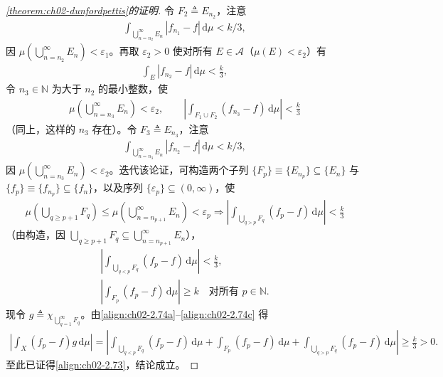 \documentclass[../../main.tex]{subfiles}%
\begin{document}
\begin{proof}[\cref{theorem:ch02-dunfordpettis}的证明]
令 $F_2\triangleq E_{n_2}$，注意
\begin{align*}
\int_{\bigcup_{n=n_2}^\infty E_n}|f_{n_1}-f|\,\mathrm{d}\mu<k/3,
\end{align*}
因 $\mu(\bigcup_{n=n_2}^\infty E_n)<\varepsilon_1$。再取 $\varepsilon_2>0$ 使对所有 $E\in\mathscr A$（$\mu(E)<\varepsilon_2$）有
\begin{align*}
\int_E|f_{n_2}-f|\,\mathrm{d}\mu<\frac k3,
\end{align*}
令 $n_3\in\mathbb N$ 为大于 $n_2$ 的最小整数，使
\begin{align*}
\mu\left(\bigcup_{n=n_3}^\infty E_n\right)<\varepsilon_2,\qquad
\left|\int_{F_1\cup F_2}(f_{n_3}-f)\,\mathrm{d}\mu\right|<\frac k3
\end{align*}
（同上，这样的 $n_3$ 存在）。令 $F_3\triangleq E_{n_3}$，注意
\begin{align*}
\int_{\bigcup_{n=n_3}^\infty E_n}|f_{n_2}-f|\,\mathrm{d}\mu<k/3,
\end{align*}
因 $\mu(\bigcup_{n=n_3}^\infty E_n)<\varepsilon_2$。迭代该论证，可构造两个子列 $\{F_p\}\equiv\{E_{n_p}\}\subseteq\{E_n\}$ 与 $\{f_p\}\equiv\{f_{n_p}\}\subseteq\{f_n\}$，以及序列 $\{\varepsilon_p\}\subseteq(0,\infty)$，使
\begin{align}
\mu\left(\bigcup_{q\geqslant p+1}F_q\right)\leqslant\mu\left(\bigcup_{n=n_{p+1}}^\infty E_n\right)<\varepsilon_p
\Rightarrow\left|\int_{\bigcup_{q>p}F_q}(f_p-f)\,\mathrm{d}\mu\right|<\frac k3 \label{align:ch02-2.74a}
\end{align}
（由构造，因 $\bigcup_{q\geqslant p+1}F_q\subseteq\bigcup_{n=n_{p+1}}^\infty E_n$），
\begin{align}
\left|\int_{\bigcup_{q<p}F_q}(f_p-f)\,\mathrm{d}\mu\right|<\frac k3, \label{align:ch02-2.74b}\\
\left|\int_{F_p}(f_p-f)\,\mathrm{d}\mu\right|\geqslant k\quad\text{对所有 }p\in\mathbb N. \label{align:ch02-2.74c}
\end{align}
现令 $g\triangleq \chi_{\bigcup_{q=1}^\infty F_q}$。由\eqref{align:ch02-2.74a}--\eqref{align:ch02-2.74c} 得
\begin{align*}
\left|\int_X(f_p-f)g\,\mathrm{d}\mu\right|
=\left|\int_{\bigcup_{q<p}F_q}(f_p-f)\,\mathrm{d}\mu+\int_{F_p}(f_p-f)\,\mathrm{d}\mu+\int_{\bigcup_{q>p}F_q}(f_p-f)\,\mathrm{d}\mu\right|
\geqslant\frac k3>0.
\end{align*}
至此已证得\eqref{align:ch02-2.73}，结论成立。
\end{proof}
\end{document}
